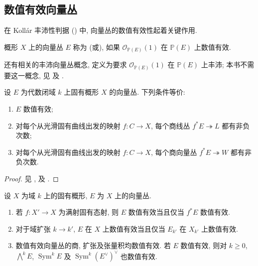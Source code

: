 \subsection{数值有效向量丛}\label{src:B.2.4-subsection}
在 Kollár 丰沛性判据 () 中, 向量丛的数值有效性起着关键作用.
\begin{definition}\label{src:B.2.31}
概形 $X$ 上的向量丛 $E$ 称为 (或), 如果 $\mathcal O_{\mathbb P(E)}(1)$ 在 $\mathbb P(E)$ 上数值有效.
\end{definition}
还有相关的丰沛向量丛概念, 定义为要求 $\mathcal O_{\mathbb P(E)}(1)$ 在 $\mathbb P(E)$ 上丰沛; 本书不需要这一概念, 见 \cite{Har66a} 及 \cite[\S$6$]{Laz04b}.
\begin{proposition}[向量丛数值有效性的刻画]\label{src:B.2.32}
设 $E$ 为代数闭域 $k$ 上固有概形 $X$ 的向量丛. 下列条件等价:
\begin{enumerate}[(1)]
\item $E$ 数值有效;
\item 对每个从光滑固有曲线出发的映射 $f:C\to X$, 每个商线丛 $f^*E\twoheadrightarrow L$ 都有非负次数;
\item 对每个从光滑固有曲线出发的映射 $f:C\to X$, 每个商向量丛 $f^*E\twoheadrightarrow W$ 都有非负次数.
\end{enumerate}
\end{proposition}
\begin{proof}
见 \cite[第 $437$ 页]{Bar71}, \cite[命题 $6.1.18$]{Laz04b} 及 \cite[定义-命题 $3.3$]{Kol90}.
\end{proof}
\begin{proposition}[向量丛数值有效性的性质]\label{src:B.2.33}
设 $X$ 为域 $k$ 上的固有概形, $E$ 为 $X$ 上的向量丛.
\begin{enumerate}[(1)]
\item 若 $f:X'\to X$ 为满射固有态射, 则 $E$ 数值有效当且仅当 $f^*E$ 数值有效.
\item 对于域扩张 $k\to k'$, $E$ 在 $X$ 上数值有效当且仅当 $E_{k'}$ 在 $X_{k'}$ 上数值有效.
\item 数值有效向量丛的商, 扩张及张量积均数值有效. 若 $E$ 数值有效, 则对 $k\geq0$, $\bigwedge^kE$, $\operatorname{Sym}^kE$ 及 $\operatorname{Sym}^k(E^\vee)^\vee$ 也数值有效.
\end{enumerate}
\end{proposition}
